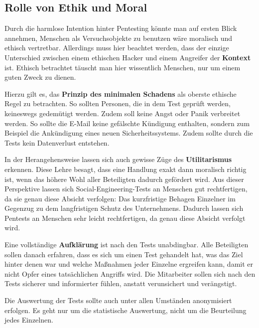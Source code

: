 \documentclass[12pt, a4paper, oneside]{scrartcl}
\begin{document}
\subsection{Rolle von Ethik und Moral}
Durch die harmlose Intention hinter Pentesting könnte man auf ersten Blick annehmen, Menschen als Versuchsobjekte
zu benutzen wäre moralisch und ethisch vertretbar. Allerdings muss hier beachtet werden, dass der 
einzige Unterschied zwischen einem ethischen Hacker und einem Angreifer der \textbf{Kontext} ist.
Ethisch betrachtet täuscht man hier wissentlich Menschen, nur um einem guten Zweck zu dienen. 
\par
Hierzu gilt es, das \textbf{Prinzip des minimalen Schadens} als oberste ethische Regel zu betrachten. So sollten
Personen, die in dem Test geprüft werden, keineswegs gedemütigt werden. Zudem soll keine Angst oder Panik
verbreitet werden. So sollte die E-Mail keine gefälschte Kündigung enthalten, sondern zum Beispiel die 
Ankündigung eines neuen Sicherheitssystems. Zudem sollte durch die Tests kein Datenverlust entstehen.
\par
In der Herangehensweise lassen sich auch gewisse Züge des \textbf{Utilitarismus} erkennen. Diese Lehre besagt,
dass eine Handlung exakt dann moralisch richtig ist, wenn das höhere Wohl aller Beteiligten dadurch gefördert wird.
Aus dieser Perspektive lassen sich Social-Engineering-Tests an Menschen gut rechtfertigen, da sie genau diese Absicht
verfolgen: Das kurzfristige Behagen Einzelner im Gegenzug zu dem langfristigen Schutz des Unternehmens.
Dadurch lassen sich Pentests an Menschen sehr leicht rechtfertigen, da genau diese Absicht verfolgt wird.
\par
Eine vollständige \textbf{Aufklärung} ist nach den Tests unabdingbar. Alle Beteiligten sollen danach
erfahren, dass es sich um einen Test gehandelt hat, was das Ziel hinter denen war und welche Maßnahmen
jeder Einzelne ergreifen kann, damit er nicht Opfer eines tatsächlichen Angriffs wird.
Die Mitarbeiter sollen sich nach den Tests sicherer und informierter fühlen, anstatt verunsichert und 
verängstigt.
\par
Die Auswertung der Tests sollte auch unter allen Umständen anonymisiert erfolgen. Es geht nur um
die statistische Auswertung, nicht um die Beurteilung jedes Einzelnen. 
\end{document}
